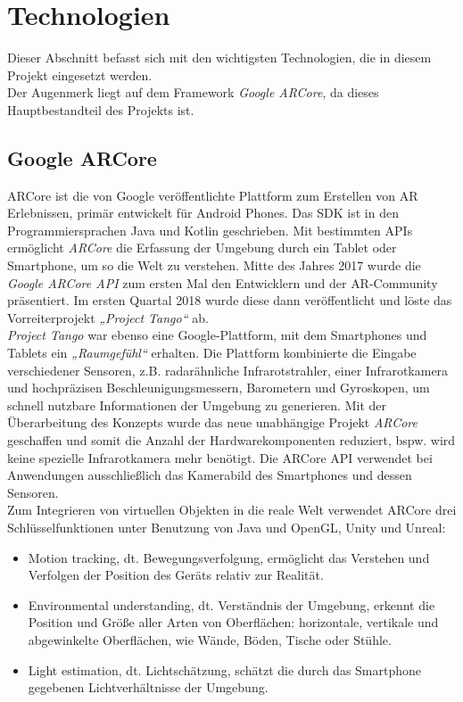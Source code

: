 \section{Technologien}
\label{chap:Technologien}                       %
Dieser Abschnitt befasst sich mit den wichtigsten Technologien, die in diesem Projekt eingesetzt werden. 
\\ 
Der Augenmerk liegt auf dem Framework \textit{Google ARCore}, da dieses Hauptbestandteil des Projekts ist. 
\subsection{Google ARCore}
\label{sec:arcore}
ARCore ist die von Google veröffentlichte Plattform zum Erstellen von \acl{AR} Erlebnissen, primär entwickelt für Android Phones. 
Das \ac{SDK} ist in den Programmiersprachen Java und Kotlin geschrieben. Mit bestimmten \acs{API}s ermöglicht \textit{ARCore} die Erfassung 
der Umgebung durch ein Tablet oder Smartphone, um so die Welt zu verstehen. Mitte des Jahres 2017 
wurde die \textit{Google ARCore API} zum ersten Mal den Entwicklern und der \acs{AR}-Community präsentiert. Im ersten Quartal 2018 wurde 
diese dann veröffentlicht und löste das Vorreiterprojekt \textit{„Project Tango“} ab. 
\\ 
\linebreak 
\textit{Project Tango} war ebenso eine Google-Plattform, mit dem Smartphones und Tablets ein \textit{„Raumgefühl“} erhalten. \cite{projecttango.2016j} 
Die Plattform kombinierte die Eingabe verschiedener Sensoren, z.B. radarähnliche Infrarotstrahler, einer Infrarotkamera und hochpräzisen 
Beschleunigungsmessern, Barometern und Gyroskopen, um schnell nutzbare Informationen der Umgebung zu generieren. Mit der Überarbeitung des 
Konzepts wurde das neue unabhängige Projekt \textit{ARCore} geschaffen und somit die Anzahl der Hardwarekomponenten reduziert, bspw. wird 
keine spezielle Infrarotkamera mehr benötigt. Die ARCore \acs{API} verwendet bei Anwendungen ausschließlich das Kamerabild des Smartphones und 
dessen Sensoren. 
\\ 
\linebreak 
Zum Integrieren von virtuellen Objekten in die reale Welt verwendet ARCore drei Schlüsselfunktionen unter Benutzung von Java und OpenGL, Unity 
und Unreal:
\begin{itemize}
    \item Motion tracking, dt. Bewegungsverfolgung, ermöglicht das Verstehen und Verfolgen der Position des Geräts relativ zur Realität.
    \item Environmental understanding, dt. Verständnis der Umgebung, erkennt die Position und Größe aller Arten von Oberflächen: horizontale, 
    vertikale und abgewinkelte Oberflächen, wie Wände, Böden, Tische oder Stühle.
    \item Light estimation, dt. Lichtschätzung, schätzt die durch das Smartphone gegebenen Lichtverhältnisse der Umgebung. \cite{arcorefundamentals.2018m}
\end{itemize}
